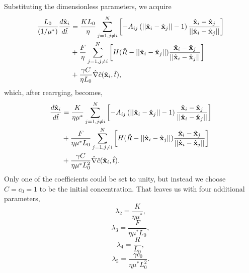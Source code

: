 Substituting the dimensionless parameters, we acquire
\begin{equation*}
    \begin{split}
        \frac{L_0}{(1/\mu^*)}\frac{d \hat{\vb{x}}_i}{d \hat{t}} &= 
        \frac{K L_0}{ \eta}\sum_{j = 1, j \neq i}^N   \left[ - A_{ij}\left( ||\hat{\vb{x}}_i - \hat{\vb{x}}_j|| -  1\right) \frac{\hat{\vb{x}}_i - \hat{\vb{x}}_j}{||\hat{\vb{x}}_i - \hat{\vb{x}}_j||} \right]\\
         &+ \frac{F}{  \eta}\sum_{j = 1, j \neq i}^N \left[H(\hat{R} - ||\hat{\vb{x}}_i - \hat{\vb{x}}_j||) \frac{\hat{\vb{x}}_i - \hat{\vb{x}}_j}{||\hat{\vb{x}}_i - \hat{\vb{x}}_j||}     \right]\\ 
         &+ \frac{\gamma C}{ \eta L_0} \hat{\nabla}  \hat{c} (\hat{\vb{x}}_i, \hat{t}),
    \end{split}
\end{equation*}
which, after rearrging, becomes,
\begin{equation*}
    \begin{split}
        \frac{d \hat{\vb{x}}_i}{d \hat{t}} &= 
        \frac{K}{ \eta \mu^*}\sum_{j = 1, j \neq i}^N   \left[ - A_{ij}\left( ||\hat{\vb{x}}_i - \hat{\vb{x}}_j|| -  1\right) \frac{\hat{\vb{x}}_i - \hat{\vb{x}}_j}{||\hat{\vb{x}}_i - \hat{\vb{x}}_j||} \right]\\
         &+ \frac{F}{  \eta \mu^* L_0}\sum_{j = 1, j \neq i}^N \left[H(\hat{R} - ||\hat{\vb{x}}_i - \hat{\vb{x}}_j||) \frac{\hat{\vb{x}}_i - \hat{\vb{x}}_j}{||\hat{\vb{x}}_i - \hat{\vb{x}}_j||}     \right]\\ 
         &+ \frac{\gamma C}{ \eta \mu^* L_0^2} \hat{\nabla}  \hat{c} (\hat{\vb{x}}_i, \hat{t}).
    \end{split}
\end{equation*}
Only one of the coefficients could be set to unity, but instead we choose $C = c_0 = 1$ to be the initial 
concentration. That leaves us with four additional parameters,
\begin{equation*}
    \lambda_2 = \frac{K}{ \eta \mu^*},
\end{equation*}
\begin{equation*}
    \lambda_3 = \frac{F}{  \eta \mu^* L_0},
\end{equation*}
\begin{equation*}
    \lambda_4 = \frac{R}{L_0},
\end{equation*}
\begin{equation*}
    \lambda_5 = \frac{\gamma c_0}{ \eta \mu^*L_0^2}.
\end{equation*}
